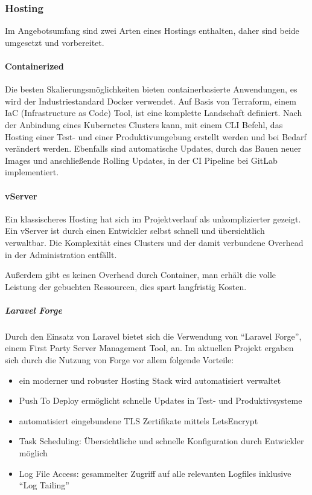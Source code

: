 \subsubsection{Hosting}
Im Angebotsumfang sind zwei Arten eines Hostings enthalten, daher sind beide umgesetzt und vorbereitet.

\paragraph{Containerized}
Die besten Skalierungsmöglichkeiten bieten containerbasierte Anwendungen, es wird der Industriestandard Docker verwendet.
Auf Basis von Terraform, einem IaC (Infrastructure as Code) Tool, ist eine komplette Landschaft definiert.
Nach der Anbindung eines Kubernetes Clusters kann, mit einem CLI Befehl, das Hosting einer Test- und einer Produktivumgebung erstellt werden und bei Bedarf verändert werden.
Ebenfalls sind automatische Updates, durch das Bauen neuer Images und anschließende Rolling Updates, in der CI Pipeline bei GitLab implementiert.

\paragraph{vServer}
Ein klassischeres Hosting hat sich im Projektverlauf als unkomplizierter gezeigt.
Ein vServer ist durch einen Entwickler selbst schnell und übersichtlich verwaltbar.
Die Komplexität eines Clusters und der damit verbundene Overhead in der Administration entfällt.

Außerdem gibt es keinen Overhead durch Container, man erhält die volle Leistung der gebuchten Ressourcen, dies spart langfristig Kosten.

\subparagraph{Laravel Forge}
Durch den Einsatz von Laravel bietet sich die Verwendung von \enquote{Laravel Forge}\cite{laravel-forge}, einem First Party Server Management Tool, an.
Im aktuellen Projekt ergaben sich durch die Nutzung von Forge vor allem folgende Vorteile:
\begin{itemize}
    \item ein moderner und robuster Hosting Stack wird automatisiert verwaltet
    \item Push To Deploy ermöglicht schnelle Updates in Test- und Produktivsysteme
    \item automatisiert eingebundene TLS Zertifikate mittels LetsEncrypt
    \item Task Scheduling: Übersichtliche und schnelle Konfiguration durch Entwickler möglich
    \item Log File Access: gesammelter Zugriff auf alle relevanten Logfiles inklusive \enquote{Log Tailing}
\end{itemize}

